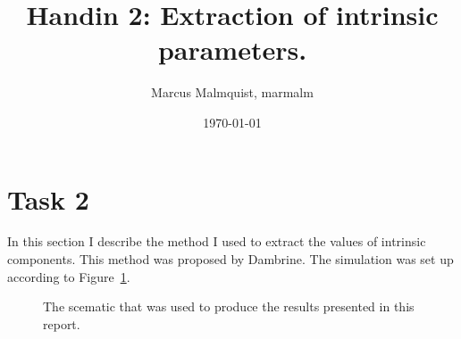 \documentclass[12pt,a4paper]{article}
\title{Handin 2: Extraction of intrinsic parameters.}
\author{Marcus Malmquist, marmalm}
\date{\today}
\begin{document}
\maketitle

\section{Task 2}\label{sec:1}
In this section I describe the method I used to extract the values of intrinsic components. This method was proposed by Dambrine.
The simulation was set up according to Figure~\ref{fig:scematic}.
\begin{figure}
  \centering
  \noindent{}
  \caption{The scematic that was used to produce the results presented in this report.}
  \label{fig:scematic}
\end{figure}
\end{document}
